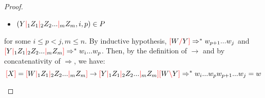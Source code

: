 \documentclass[12pt]{extarticle}
\theoremstyle{definition} \newtheorem{defn}{Definition}
\theoremstyle{definition} \newtheorem{prop}{Proposition}
\newcommand{\lc}{\textcolor{red}{\backslash}}
\newcommand{\rc}{\textcolor{red}{/}}
\newcommand{\mc}{\textcolor{red}{|}}
\newcommand{\lb}{\textcolor{red}{[}}
\newcommand{\rb}{\textcolor{red}{]}}
\begin{document}
\begin{proof}
\begin{enumerate}
\begin{itemize}
                \item $(Y \mc_1 Z_1 \mc_2 Z_2 ... \mc_m Z_m, i, p) \in P$
            \end{itemize}
            for some $i \leq p < j, m \leq n$. By inductive hypothesis,
            $\lb W \rc Y \rb \Rightarrow^* w_{p + 1} ... w_j$
            and
            $\lb Y \mc_1 Z_1 \mc_2 Z_2 ... \mc_m Z_m \rb \Rightarrow^* w_i ... w_p$.
            Then, by the definition of $\rightarrow$ and by concatenativity of
            $\Rightarrow$, we have:
            \[
                \lb X \rb = \lb W \mc_1 Z_1 \mc_2 Z_2 ... \mc_m Z_m \rb
                \rightarrow
                \lb Y \mc_1 Z_1 \mc_2 Z_2 ... \mc_m Z_m \rb \lb W \lc Y \rb
                \Rightarrow^*
                w_i ... w_p w_{p + 1} ... w_j = w
            \]
    \end{enumerate}
\end{proof}
\end{document}
